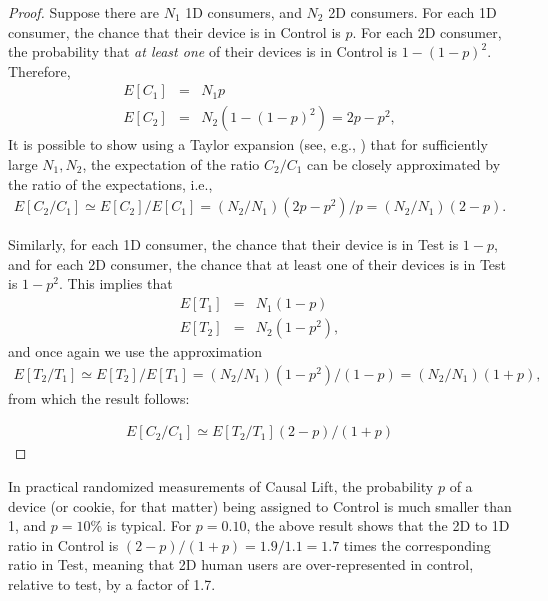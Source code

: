 \documentclass[11pt,a4paper]{article}
\theoremstyle{definition}
\theoremstyle{remark}
\theoremstyle{definition}
\theoremstyle{definition}
\theoremstyle{definition}
\theoremstyle{definition}
\theoremstyle{definition}
\theoremstyle{definition}
\begin{document}
\begin{proof}\small
Suppose there are $N_1$ 1D consumers, and $N_2$ 2D consumers. For each 1D consumer, the chance that their device is in Control is $p$. For each 2D consumer, the probability that \textit{at least one} of their devices is in Control is $1 - (1-p)^2$. Therefore, 
\begin{eqnarray*}
	E[C_1] &=& N_1 p\\
	E[C_2] &=& N_2 (1 - (1-p)^2) = 2p - p^2,
\end{eqnarray*}
It is possible to show using a Taylor expansion (see, e.g., \cite{taylor-stack-exchange})
that for sufficiently large $N_1, N_2$, the expectation of the ratio $C_2/C_1$ can be closely approximated by the ratio of the expectations, i.e., 
\begin{eqnarray*}
E[C_2/C_1] \simeq E[C_2]/E[C_1] = (N_2/N_1)(2p-p^2)/p = (N_2/N_1)(2-p).	
\end{eqnarray*}

Similarly, for each 1D consumer, the chance that their device is in Test is $1-p$, and for each 2D consumer, the chance that at least one of their devices is in Test is $1 - p^2$. This implies that
\begin{eqnarray*}
	E[T_1] &=& N_1 (1-p)\\
	E[T_2] &=& N_2 (1 - p^2),
\end{eqnarray*}
and once again we use the approximation
\begin{eqnarray*}
E[T_2/T_1] \simeq E[T_2]/E[T_1] = (N_2/N_1)(1-p^2)/(1-p) = (N_2/N_1)(1+p),
\end{eqnarray*}
from which the result follows:

\begin{eqnarray*}
E[C_2/C_1] \simeq E[T_2/T_1] (2-p)/(1+p)
\end{eqnarray*}

\end{proof}

In practical randomized measurements of Causal Lift, the probability $p$ of a device (or cookie, for that matter) being assigned to Control is much smaller than 1, and $p = 10\%$ is typical. For $p = 0.10$, the above result shows that the 2D to 1D ratio in Control is $(2-p)/(1+p) = 1.9/1.1 = 1.7$ times the corresponding ratio in Test, meaning that 2D human users are over-represented in control, relative to test, by a factor of 1.7. 
\end{document}
